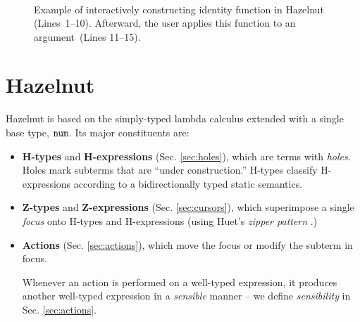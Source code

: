 \documentclass{llncs}
\begin{document}
\begin{figure}[t]
\[\begin{array}{|c||c|c||l|l|}
\end{array}
\]
\caption{Example of interactively constructing identity function in Hazelnut (Lines~1--10).
  Afterward, the user applies this function to an argument~(Lines 11--15).}
\label{fig:first-example}
\end{figure}

\section{Hazelnut}
\label{sec:hazel}
Hazelnut is based on the simply-typed lambda calculus extended with a single base type, $\texttt{num}$. Its major constituents are:
\begin{itemize}
\item \textbf{H-types} and \textbf{H-expressions} (Sec. \ref{sec:holes}), which are terms with \emph{holes}. Holes mark subterms that are ``under construction.'' H-types classify H-expressions according to a {bidirectionally typed} static semantics.
\item \textbf{Z-types} and \textbf{Z-expressions} (Sec. \ref{sec:cursors}), which superimpose a single \emph{focus} onto H-types and H-expressions (using Huet's \emph{zipper pattern} \cite{JFP::Huet1997}.)
\item \textbf{Actions} (Sec. \ref{sec:actions}), which move the focus or modify the subterm in focus.

Whenever an action is performed on a well-typed expression, it produces another well-typed expression in a \emph{sensible} manner -- we define \emph{sensibility} in Sec. \ref{sec:actions}.
\end{itemize}
\end{document}
